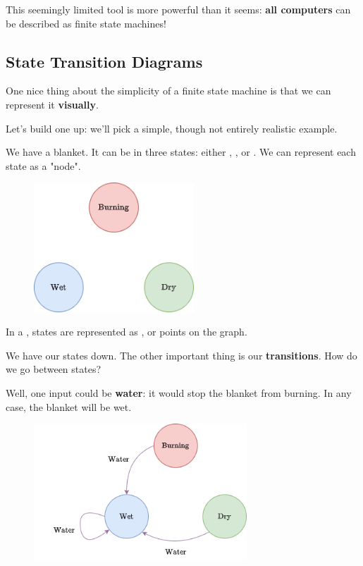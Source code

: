         This seemingly limited tool is more powerful than it seems: \textbf{all computers} can be described as finite state machines!

    \subsection{State Transition Diagrams}

        One nice thing about the simplicity of a finite state machine is that we can represent it \textbf{visually}.
            
        Let's build one up: we'll pick a simple, though not entirely realistic example.
        
        \miniex We have a blanket. It can be in three states: either , , or . We can represent each state as a "node".
        
        \begin{figure}[H]
            \centering
            \includegraphics[width=60mm,scale=0.4]{images/rnn_images/std_states.png}
        \end{figure}
        
        \begin{concept}
            In a , states are represented as , or points on the graph.
        \end{concept}
        
        We have our states down. The other important thing is our \textbf{transitions}. How do we go between states?
        
        Well, one input could be \textbf{water}: it would stop the blanket from burning. In any case, the blanket will be wet.
        
        \begin{figure}[H]
            \centering
            \includegraphics[width=80mm,scale=0.4]{images/rnn_images/std_water.png}
        \end{figure}
        
